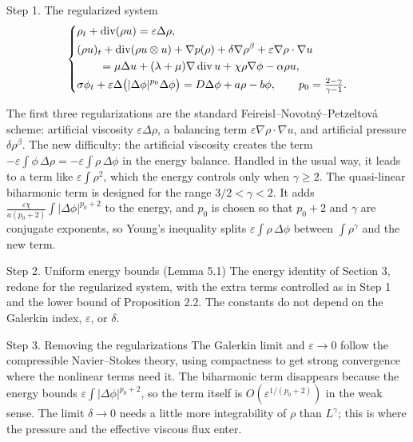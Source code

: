 \begin{stepnew}{\newidea{}Step 1. The regularized system}
\[
    \left\{
    \begin{aligned}
      &\rho_t + \operatorname{div}(\rho u) = \varepsilon\Delta\rho, \\
      &(\rho u)_t + \operatorname{div}(\rho u\otimes u) + \nabla p(\rho) + \delta\nabla\rho^\beta + \varepsilon\nabla\rho\cdot\nabla u \\
      &\qquad = \mu\Delta u + (\lambda+\mu)\nabla\operatorname{div} u + \chi\rho\nabla\phi - \alpha\rho u, \\
      &\sigma\phi_t + \varepsilon\Delta\big(|\Delta\phi|^{p_0}\Delta\phi\big) = D\Delta\phi + a\rho - b\phi,
      \qquad p_0 = \tfrac{2-\gamma}{\gamma-1}.
    \end{aligned}
    \right.
    \]

The first three regularizations are the standard Feireisl--Novotný--Petzeltová scheme: artificial viscosity $\varepsilon\Delta\rho$, a balancing term $\varepsilon\nabla\rho\cdot\nabla u$, and artificial pressure $\delta\rho^\beta$. The new difficulty: the artificial viscosity creates the term $-\varepsilon\int\phi\,\Delta\rho = -\varepsilon\int\rho\,\Delta\phi$ in the energy balance. Handled in the usual way, it leads to a term like $\varepsilon\int\rho^2$, which the energy controls only when $\gamma \ge 2$. The quasi-linear biharmonic term is designed for the range $3/2 < \gamma < 2$. It adds $\frac{\varepsilon\chi}{a(p_0+2)}\int|\Delta\phi|^{p_0+2}$ to the energy, and $p_0$ is chosen so that $p_0 + 2$ and $\gamma$ are conjugate exponents, so Young's inequality splits $\varepsilon\int\rho\,\Delta\phi$ between $\int\rho^\gamma$ and the new term.

\end{stepnew}

\begin{step}{\routine{}Step 2. Uniform energy bounds (Lemma 5.1)}
The energy identity of Section 3, redone for the regularized system, with the extra terms controlled as in Step 1 and the lower bound of Proposition 2.2. The constants do not depend on the Galerkin index, $\varepsilon$, or $\delta$.

\end{step}

\begin{step}{\routine{}Step 3. Removing the regularizations}
The Galerkin limit and $\varepsilon \to 0$ follow the compressible Navier--Stokes theory, using compactness to get strong convergence where the nonlinear terms need it. The biharmonic term disappears because the energy bounds $\varepsilon\int|\Delta\phi|^{p_0+2}$, so the term itself is $O(\varepsilon^{1/(p_0+2)})$ in the weak sense. The limit $\delta \to 0$ needs a little more integrability of $\rho$ than $L^\gamma$; this is where the pressure and the effective viscous flux enter.

\end{step}

